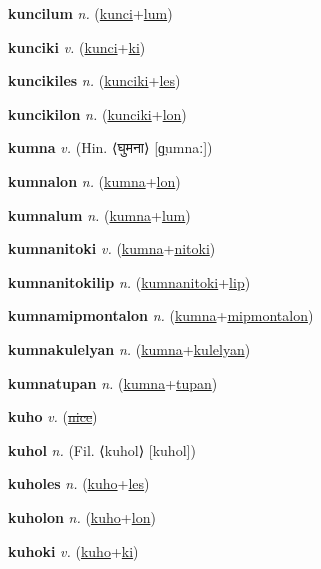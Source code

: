 \textbf{\hypertarget{kuncilum}{kuncilum}} \textit{n.} (\hyperlink{kunci}{kunci}+\allowbreak \hyperlink{lum}{lum})


\textbf{\hypertarget{kunciki}{kunciki}} \textit{v.} (\hyperlink{kunci}{kunci}+\allowbreak \hyperlink{ki}{ki})


\textbf{\hypertarget{kuncikiles}{kuncikiles}} \textit{n.} (\hyperlink{kunciki}{kunciki}+\allowbreak \hyperlink{les}{les})


\textbf{\hypertarget{kuncikilon}{kuncikilon}} \textit{n.} (\hyperlink{kunciki}{kunciki}+\allowbreak \hyperlink{lon}{lon})


\textbf{\hypertarget{kumna}{kumna}} \textit{v.} (Hin. ⟨{\devanagari{}घुमना}⟩ [ɡ̤umnaː])


\textbf{\hypertarget{kumnalon}{kumnalon}} \textit{n.} (\hyperlink{kumna}{kumna}+\allowbreak \hyperlink{lon}{lon})


\textbf{\hypertarget{kumnalum}{kumnalum}} \textit{n.} (\hyperlink{kumna}{kumna}+\allowbreak \hyperlink{lum}{lum})


\textbf{\hypertarget{kumnanitoki}{kumnanitoki}} \textit{v.} (\hyperlink{kumna}{kumna}+\allowbreak \hyperlink{nitoki}{nitoki})


\textbf{\hypertarget{kumnanitokilip}{kumnanitokilip}} \textit{n.} (\hyperlink{kumnanitoki}{kumnanitoki}+\allowbreak \hyperlink{lip}{lip})


\textbf{\hypertarget{kumnamipmontalon}{kumnamipmontalon}} \textit{n.} (\hyperlink{kumna}{kumna}+\allowbreak \hyperlink{mipmontalon}{mipmontalon})


\textbf{\hypertarget{kumnakulelyan}{kumnakulelyan}} \textit{n.} (\hyperlink{kumna}{kumna}+\allowbreak \hyperlink{kulelyan}{kulelyan})


\textbf{\hypertarget{kumnatupan}{kumnatupan}} \textit{n.} (\hyperlink{kumna}{kumna}+\allowbreak \hyperlink{tupan}{tupan})


\textbf{\hypertarget{kuho}{kuho}} \textit{v.} (\hyperlink{nice}{\sout{nice}})


\textbf{\hypertarget{kuhol}{kuhol}} \textit{n.} (Fil. ⟨kuhol⟩ [kuhol])


\textbf{\hypertarget{kuholes}{kuholes}} \textit{n.} (\hyperlink{kuho}{kuho}+\allowbreak \hyperlink{les}{les})


\textbf{\hypertarget{kuholon}{kuholon}} \textit{n.} (\hyperlink{kuho}{kuho}+\allowbreak \hyperlink{lon}{lon})


\textbf{\hypertarget{kuhoki}{kuhoki}} \textit{v.} (\hyperlink{kuho}{kuho}+\allowbreak \hyperlink{ki}{ki})


